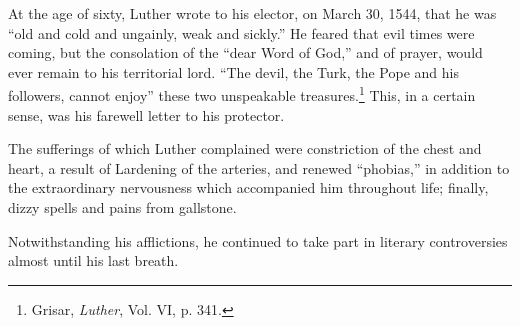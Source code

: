 At the age of sixty, Luther wrote to his elector, on March 30, 1544,
that he was “old and cold and ungainly, weak and sickly.” He feared
that evil times were coming, but the consolation of the “dear Word of
God,” and of prayer, would ever remain to his territorial lord. “The
devil, the Turk, the Pope and his followers, cannot enjoy” these
two unspeakable treasures.\footnote{Grisar, \textit{Luther}, Vol. VI, p. 341.}
This, in a certain sense, was his farewell
letter to his protector.

The sufferings of which Luther complained were constriction of
the chest and heart, a result of Lardening of the arteries, and renewed
“phobias,” in addition to the extraordinary nervousness which
accompanied him throughout life; finally, dizzy spells and pains from
gallstone.

Notwithstanding his afflictions, he continued to take part in literary
controversies almost until his last breath.

